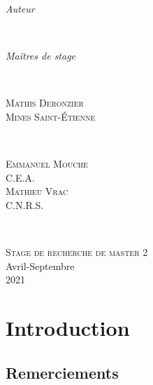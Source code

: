 \documentclass[a4paper,11pt]{article}
\numberwithin{equation}{section}
\begin{document}
	\begin{center}
	\begin{minipage}{0.4\textwidth}
		\begin{flushleft} \Large
			\emph{Auteur}\\
		\end{flushleft}
	\end{minipage}
	~
	\begin{minipage}{0.4\textwidth}
		\begin{flushright} \Large
			\emph{Maîtres de stage} \\
		\end{flushright}
	\end{minipage}\\[0.5 cm]
	\begin{minipage}{0.4\textwidth}
		\begin{flushleft} \large
			\textsc{Mathis Deronzier}\\
			\textsc{Mines Saint-Étienne}
		\end{flushleft}
	\end{minipage}
	~
	\begin{minipage}{0.4\textwidth}
		\begin{flushright} \large
			\textsc{Emmanuel Mouche}\\
			\textsc{C.E.A.}\\
			\textsc{Mathieu Vrac}\\
			\textsc{C.N.R.S.}
		\end{flushright}
	\end{minipage}\\[2cm]
	\end{center}
	\begin{center}
		\textsc{\Large Stage de recherche de master 2}\\[0.5cm]  
		\large Avril-Septembre\\2021\\[2cm]
	\end{center}
\setcounter{section}{-1}

\newpage

\tableofcontents

\vspace{2cm}

\newpage

\section{Introduction}
\label{ch:introduction}

\subsection{Remerciements}
\end{document}
